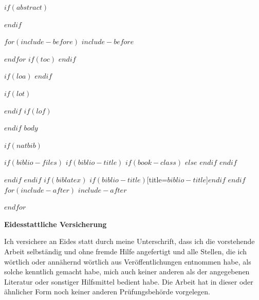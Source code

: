 \documentclass[$if(fontsize)$$fontsize$,$endif$$if(lang)$$lang$,$endif$$if(papersize)$$papersize$,$endif$$for(classoption)$$classoption$$sep$,$endfor$]{$documentclass$}
\begin{document}
\restoregeometry

$if(abstract)$
\begin{abstract}
$abstract$
\end{abstract}
\newpage
$endif$

$for(include-before)$
$include-before$

$endfor$
$if(toc)$
{
\hypersetup{linkcolor=black}
\setcounter{tocdepth}{$toc-depth$}
\tableofcontents
}
$endif$


$if(loa)$
\newpage
\printnoidxglossary[type=acronym, style=superheader,title=Acronyms]
$endif$

$if(lot)$
\newpage
\listoftables
$endif$
$if(lof)$
\newpage
\listoffigures
$endif$
\newpage
{} 
$body$

\newpage
{}
$if(natbib)$

$if(biblio-files)$
$if(biblio-title)$
$if(book-class)$
\renewcommand\bibname{$biblio-title$}
$else$
\renewcommand\refname{$biblio-title$}
$endif$
$endif$


$endif$
$endif$
$if(biblatex)$
\renewcommand*{\mkbibnamefamily}[1]{\textbf{#1}}
\renewcommand*{\mkbibnamegiven}[1]{\textbf{#1}}
\renewcommand*{\mkbibnameprefix}[1]{\textbf{#1}}
\renewcommand*{\mkbibnamesuffix}[1]{\textbf{#1}}
\printbibliography$if(biblio-title)$[title=$biblio-title$]$endif$
$endif$
$for(include-after)$
$include-after$

$endfor$

\newpage
\textbf{Eidesstattliche Versicherung}

\bigskip

Ich versichere an Eides statt durch meine Unterschrift, dass ich die vorstehende Arbeit selbständig und ohne fremde Hilfe angefertigt und alle Stellen, die ich wörtlich oder annähernd wörtlich aus Veröffentlichungen entnommen habe, als solche kenntlich gemacht habe, mich auch keiner anderen als der angegebenen Literatur oder sonstiger Hilfsmittel bedient habe. Die Arbeit hat in dieser oder ähnlicher Form noch keiner anderen Prüfungsbehörde vorgelegen.

\vspace{1cm}
\rule{0pt}{2\baselineskip} %
\par\noindent{} \hfill\makebox[2.25in]{\hrulefill}%
\par\noindent\makebox[2.25in][l]{} \hfill{}%
\end{document}
